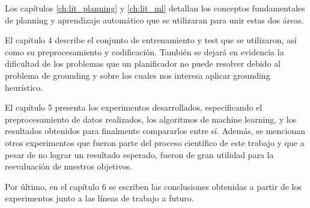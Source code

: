 Los capítulos \ref{ch:lit_planning} y \ref{ch:lit_ml} detallan los conceptos
fundamentales de planning y aprendizaje automático que se utilizaran para unir
estas dos áreas.

El capítulo 4 describe el conjunto de entrenamiento y test que se utilizaron,
así como su preprocesamiento y codificación. También se dejará en evidencia la
dificultad de los problemas que un planificador no puede resolver debido al
problema de grounding y sobre los cuales nos interesa aplicar grounding
heurístico.

El capítulo 5 presenta los experimentos desarrollados, especificando el
preprocesamiento de datos realizados, los algoritmos de machine learning, y los
resultados obtenidos para finalmente compararlos entre sí. Además, se mencionan
otros experimentos que fueron parte del proceso científico de este trabajo y que
a pesar de no lograr un resultado esperado, fueron de gran utilidad para la
reevaluación de nuestros objetivos.

Por último, en el capítulo 6 se escriben las conclusiones obtenidas a partir de
los experimentos junto a las líneas de trabajo a futuro.